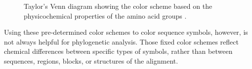 \begin{figure}[hbt]
\caption[Taylor's Amino Acid Color Scheme]{Taylor's \cite{LIN2002361} Venn diagram showing the color scheme based on the physicochemical properties of the amino acid groups \cite{Procter2010aa}.}\label{fig:procter-2d}
\end{figure}

Using these pre-determined color schemes to color sequence symbols, however, is not always helpful for phylogenetic analysis. Those fixed color schemes reflect chemical differences between specific types of symbols, rather than between sequences, regions, blocks, or structures of the alignment.

